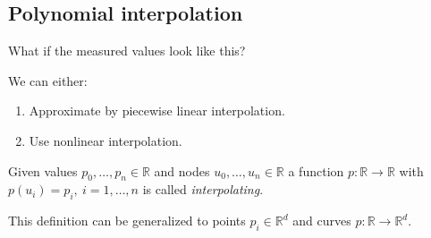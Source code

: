 \pagebreak
\subsection{Polynomial interpolation}
What if the measured values look like this?
\begin{center}   
\end{center}     
We can either:
\begin{enumerate}
    \item {
        Approximate by piecewise linear interpolation.
    }
    \item {
        Use nonlinear interpolation.
    }
\end{enumerate}
\begin{definition}
    Given values $p_0, \dots, p_n \in \mathbb{R}$ and
    nodes $u_0, \dots, u_n \in \mathbb{R}$
    a function $p : \mathbb{R} \to \mathbb{R}$ with
    $p(u_i) = p_i,\ i = 1, \dots, n$ is called \textit{interpolating}.
\end{definition}
\begin{remark}
    This definition can be generalized to points
    $p_i \in \mathbb{R}^d$ and curves $p : \mathbb{R} \to \mathbb{R}^d$.
\end{remark}

